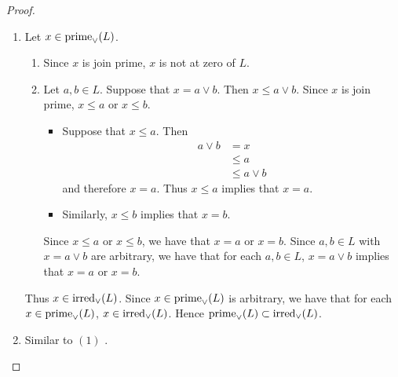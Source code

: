 \documentclass{book}
\begin{document}
	\begin{proof}\
		\begin{enumerate}
			\item Let $x \in \operatorname*{\text{prime}_{\vee}}(L)$.
			\begin{enumerate}
				\item Since $x$ is join prime, $x$ is not at zero of $L$.
				\item Let $a,b \in L$. Suppose that $x = a \vee b$. Then $x \leq a \vee b$. Since $x$ is join prime, $x \leq a$ or $x \leq b$. 
				\begin{itemize}
					\item Suppose that $x \leq a$. Then 
					\begin{align*}
						a \vee b
						& = x \\
						& \leq a \\
						& \leq a \vee b
					\end{align*}
					and therefore $x = a$. Thus $x \leq a$ implies that $x = a$.
					\item Similarly, $x \leq b$ implies that $x = b$. 
				\end{itemize}
				Since $x \leq a$ or $x \leq b$, we have that $x = a$ or $x = b$. Since $a,b \in L$ with $x = a \vee b$ are arbitrary, we have that for each $a,b \in L$, $x = a \vee b$ implies that $x = a$ or $x = b$.
			\end{enumerate} 
			Thus $x \in \operatorname*{\text{irred}_{\vee}}(L)$. Since $x \in \operatorname*{\text{prime}_{\vee}}(L)$ is arbitrary, we have that for each $x \in \operatorname*{\text{prime}_{\vee}}(L)$, $x \in \operatorname*{\text{irred}_{\vee}}(L)$. Hence $\operatorname*{\text{prime}_{\vee}}(L) \subset \operatorname*{\text{irred}_{\vee}}(L)$.
			\item Similar to $(1)$ \tcr{use duality}. 
		\end{enumerate}
	\end{proof}
	
	
	
	
	
	
	
	
	
	
	
	
	
	
	
	
	
	
	
	
	
	
	
	
	
	
	
	
	
	
	
	
	
	
	
	
	
\end{document}
